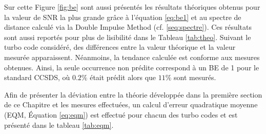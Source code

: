 Sur cette Figure \ref{fig:be} sont aussi présentés les résultats théoriques obtenus pour la valeur de SNR la plus grande
grâce à l'équation \ref{eq:be1} et au spectre de distance calculé via la Double Impulse Method (cf. \ref{seq:spectre}).
Ces résultats sont aussi reportés pour plus de lisibilité dans le Tableau \ref{tab:theo}. Suivant le turbo code considéré,
des différences entre la valeur théorique et la valeur mesurée apparaissent. Néanmoins, la tendance calculée est conforme
aux mesures obtenues. Ainsi, la seule occurrence non prédite correspond à un BE de 1 pour le standard CCSDS, où $0.2\%$ 
était prédit alors que $11\%$ sont mesurés.

\begin{table}[]
\centering
\caption{Distribution théorique des erreurs dans le plancher d'erreur selon l'équation \ref{eq:be1} pour plusieurs turbo codes standardisés}
\label{tab:theo}
\end{table}

Afin de présenter la déviation entre la théorie développée dans la première section de ce Chapitre et les mesures 
effectuées, un calcul d'erreur quadratique moyenne (EQM, Équation \ref{eq:eqm}) est effectué pour chacun des turbo codes 
et est présenté dans le tableau \ref{tab:eqm}.

